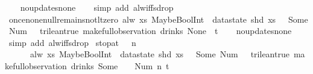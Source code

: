 \begin{isabellebody}
%
\isadelimproof
\ \ %
\endisadelimproof
%
\isatagproof
{}\isamarkupfalse%
\ no{\isacharunderscore}updates{\isacharunderscore}none\isanewline
\ \ \isamarkupfalse%
\ {\isacharparenleft}simp\ add{\isacharcolon}\ alw{\isacharunderscore}iff{\isacharunderscore}sdrop{\isacharparenright}%
\endisatagproof
{\isafoldproof}%
%
\isadelimproof
\isanewline
%
\endisadelimproof
\isanewline
{}\isamarkupfalse%
\ once{\isacharunderscore}none{\isacharunderscore}null{\isacharunderscore}remains{\isacharunderscore}not{\isacharunderscore}lt{\isacharunderscore}zero{\isacharcolon}\ {\isachardoublequoteopen}alw\ {\isacharparenleft}{\isasymlambda}xs{\isachardot}\ MaybeBoolInt\ {\isacharparenleft}{\isacharless}{\isacharparenright}\ {\isacharparenleft}datastate\ {\isacharparenleft}shd\ xs{\isacharparenright}\ {\isachardollar}\ {}{\isacharparenright}\ {\isacharparenleft}Some\ {\isacharparenleft}Num\ {}{\isacharparenright}{\isacharparenright}\ {\isasymnoteq}\ trilean{\isachardot}true{\isacharparenright}\ {\isacharparenleft}make{\isacharunderscore}full{\isacharunderscore}observation\ drinks\ None\ {\isacharless}{\isachargreater}\ t{\isacharparenright}{\isachardoublequoteclose}\isanewline
%
\isadelimproof
\ \ %
\endisadelimproof
%
\isatagproof
{}\isamarkupfalse%
\ no{\isacharunderscore}updates{\isacharunderscore}none\isanewline
\ \ \isamarkupfalse%
\ {\isacharparenleft}simp\ add{\isacharcolon}\ alw{\isacharunderscore}iff{\isacharunderscore}sdrop{\isacharparenright}%
\endisatagproof
{\isafoldproof}%
%
\isadelimproof
\isanewline
%
\endisadelimproof
\isanewline
{}\isamarkupfalse%
\ stop{\isacharunderscore}at{\isacharunderscore}{}{\isacharcolon}\ {\isachardoublequoteopen}{}\ {\isasymle}\ n\ {\isasymLongrightarrow}\isanewline
\ \ \ \ \ \ alw\ {\isacharparenleft}{\isasymlambda}xs{\isachardot}\ MaybeBoolInt\ {\isacharparenleft}{\isacharless}{\isacharparenright}\ {\isacharparenleft}datastate\ {\isacharparenleft}shd\ xs{\isacharparenright}\ {\isachardollar}\ {}{\isacharparenright}\ {\isacharparenleft}Some\ {\isacharparenleft}Num\ {}{\isacharparenright}{\isacharparenright}\ {\isasymnoteq}\ trilean{\isachardot}true{\isacharparenright}\ {\isacharparenleft}make{\isacharunderscore}full{\isacharunderscore}observation\ drinks\ {\isacharparenleft}Some\ {}{\isacharparenright}\ {\isacharparenleft}{\isacharless}{\isachargreater}{\isacharparenleft}{}\ {\isacharcolon}{\isacharequal}\ Num\ n{\isacharparenright}{\isacharparenright}\ t{\isacharparenright}{\isachardoublequoteclose}\isanewline

\end{isabellebody}

